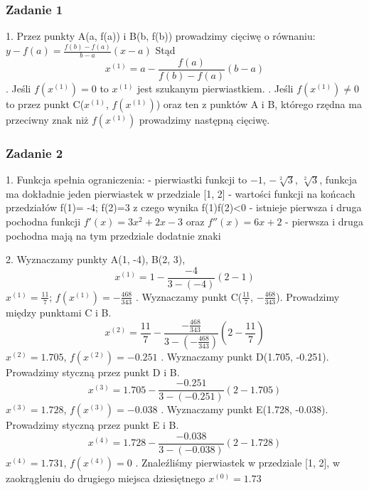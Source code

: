 \documentclass[a4paper]{article}
\begin{document}
\subsubsection*{Zadanie 1}
1. Przez punkty  A(a, f(a)) i B(b, f(b)) prowadzimy cięciwę o równaniu: $y-f(a) = \frac{f(b)-f(a)}{b-a}(x-a)$ \newline
Stąd $$x^{(1)} = a - \frac{f(a)}{f(b)-f(a)}(b-a)$$ 
. Jeśli $f(x^{(1)}) = 0$ to $x^{(1)}$ jest szukanym pierwiastkiem. . Jeśli $f(x^{(1)}) \neq 0$ to przez punkt C($x^{(1)}$, $f(x^{(1)})$) oraz  ten z punktów A i B, którego rzędna ma przeciwny znak niż  $f(x^{(1)})$ prowadzimy następną cięciwę. 

\subsubsection*{Zadanie 2}
1. Funkcja spełnia ograniczenia: \newline
- pierwiastki funkcji to $-1$, $-\sqrt[2]{3}$, $\sqrt[2]{3}$, funkcja ma dokładnie jeden pierwiastek w przedziale [1, 2] \newline
- wartości funkcji na końcach przedziałów f(1)= -4; f(2)=3 z czego wynika f(1)f(2)<0 \newline
- istnieje pierwsza i druga pochodna funkcji
$f'(x) = 3x^2+2x-3$ oraz $f''(x)=6x+2$ \newline
- pierwsza i druga pochodna mają na tym przedziale dodatnie znaki \newline

2. Wyznaczamy punkty A(1, -4), B(2, 3), $$x^{(1)} = 1 - \frac{-4}{3-(-4)}(2-1)$$
$x^{(1)} = \frac{11}{7}$; $f(x^{(1)})=-\frac{468}{343}$
\newline
{}. Wyznaczamy punkt C($\frac{11}{7}$, $-\frac{468}{343}$). Prowadzimy między punktami C i B.
$$x^{(2)} = \frac{11}{7} - \frac{-\frac{468}{343}}{3-(-\frac{468}{343})}(2-\frac{11}{7})$$ \newline
$x^{(2)} =1.705$, $f(x^{(2)})=-0.251$
\newline {}. Wyznaczamy punkt D(1.705, -0.251). Prowadzimy styczną przez punkt D i B.
$$x^{(3)} = 1.705 - \frac{-0.251}{3-(-0.251)}(2-1.705)$$ \newline
$x^{(3)} =1.728$, $f(x^{(3)})=-0.038$
\newline {}. Wyznaczamy punkt E(1.728, -0.038). Prowadzimy styczną przez punkt E i B.
$$x^{(4)} = 1.728 - \frac{-0.038}{3-(-0.038)}(2-1.728)$$ \newline
$x^{(4)} =1.731$, $f(x^{(4)})=0$
\newline {}. Znaleźliśmy pierwiastek w przedziale [1, 2], w zaokrągleniu do drugiego miejsca dziesiętnego $x^{(0)} =1.73$
\end{document}

